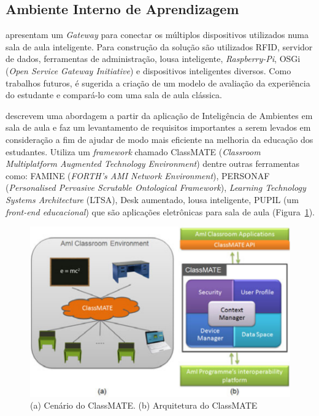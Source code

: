 
\subsection{Ambiente Interno de Aprendizagem}
\label{section:wIndoorClassroom}


\cite{Bargaoui:2014} apresentam um \textit{Gateway} para conectar os múltiplos dispositivos utilizados numa sala de aula inteligente. Para construção da solução são utilizados RFID, servidor de dados, ferramentas de administração, lousa inteligente, \textit{Raspberry-Pi}, OSGi (\textit{Open Service Gateway Initiative}) e dispositivos inteligentes diversos. Como trabalhos futuros, é sugerida a criação de um modelo de avaliação da experiência do estudante e compará-lo com uma sala de aula clássica.

\cite{Margetis:2011} descrevem uma abordagem a partir da aplicação de Inteligência de Ambientes em sala de aula e faz um levantamento de requisitos importantes a serem levados em consideração a fim de ajudar de modo mais eficiente na melhoria da educação dos estudantes. Utiliza um \textit{framework} chamado ClassMATE (\textit{Classroom Multiplatform Augmented Technology Environment}) dentre outras ferramentas como: FAMINE (\textit{FORTH's AMI Network Environment}), PERSONAF (\textit{Personalised Pervasive Scrutable Ontological Framework}), \textit{Learning Technology Systems Architecture} (LTSA), Desk aumentado, lousa inteligente, PUPIL (um \textit{front-end educacional}) que são aplicações eletrônicas para sala de aula (Figura~\ref{fig:margetis2011}).

\begin{figure}[ht]
\centering
\includegraphics[width=0.8\linewidth]{imgs/margetis2011}
\caption{(a) Cenário do ClassMATE. (b) Arquitetura do ClassMATE}
\label{fig:margetis2011}
\end{figure}


